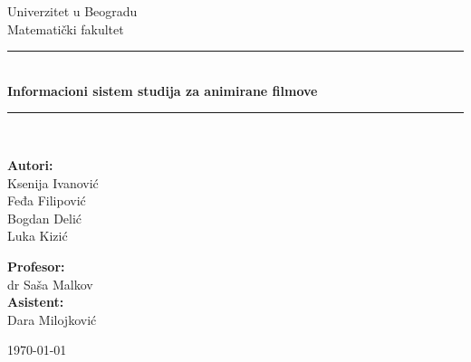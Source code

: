 \documentclass{article}
\date{}
\begin{document}
	
	
	\begin{titlepage}
		\centering
		{\LARGE Univerzitet u Beogradu}\\[0.5cm]
		{\LARGE Matematički fakultet}\\[2.5cm]
		
		\rule{\linewidth}{0.5mm} \\[0.4cm]
		{\Huge \textbf{Informacioni sistem studija za animirane filmove}} \\[0.2cm]
		\rule{\linewidth}{0.5mm} \\[3cm]
		
		\noindent
		\begin{minipage}{0.4\textwidth}
			\begin{flushleft} \large
				\textbf{Autori:}\\
				Ksenija Ivanović\\
				Feđa Filipović\\
				Bogdan Delić\\
				Luka Kizić
			\end{flushleft}
		\end{minipage}%
		\hfill
		\begin{minipage}{0.4\textwidth}
			\begin{flushright} \large
				\textbf{Profesor:} \\
				dr Saša Malkov\\[0.5cm]
				\textbf{Asistent:} \\
				Dara Milojković
			\end{flushright}
		\end{minipage}
		
		\vfill
		
		{\Large \today}
		
	\end{titlepage}
	
	\tableofcontents
	
	\newpage
	
	
	
	
	
	
	
\end{document}
